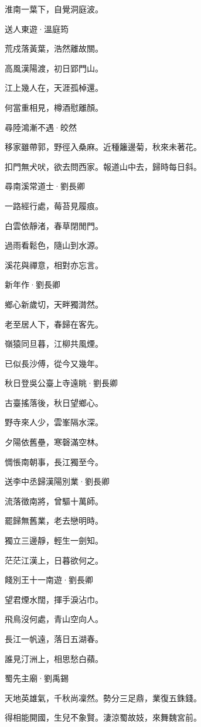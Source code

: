\documentclass[12pt,a4paper]{ctexbook}
\begin{document}
淮南一葉下，自覺洞庭波。\par
送人東遊·溫庭筠\par
荒戍落黃葉，浩然離故關。\par
高風漢陽渡，初日郢門山。\par
江上幾人在，天涯孤棹還。\par
何當重相見，樽酒慰離顏。\par
尋陸鴻漸不遇·皎然\par
移家雖帶郭，野徑入桑麻。近種籬邊菊，秋來未著花。\par
扣門無犬吠，欲去問西家。報道山中去，歸時每日斜。\par
尋南溪常道士·劉長卿\par
一路經行處，莓苔見履痕。\par
白雲依靜渚，春草閉閒門。\par
過雨看鬆色，隨山到水源。\par
溪花與禪意，相對亦忘言。\par
新年作·劉長卿\par
鄉心新歲切，天畔獨潸然。\par
老至居人下，春歸在客先。\par
嶺猿同旦暮，江柳共風煙。\par
已似長沙傅，從今又幾年。\par
秋日登吳公臺上寺遠眺·劉長卿\par
古臺搖落後，秋日望鄉心。\par
野寺來人少，雲峯隔水深。\par
夕陽依舊壘，寒磬滿空林。\par
惆悵南朝事，長江獨至今。\par
送李中丞歸漢陽別業·劉長卿\par
流落徵南將，曾驅十萬師。\par
罷歸無舊業，老去戀明時。\par
獨立三邊靜，輕生一劍知。\par
茫茫江漢上，日暮欲何之。\par
餞別王十一南遊·劉長卿\par
望君煙水闊，揮手淚沾巾。\par
飛鳥沒何處，青山空向人。\par
長江一帆遠，落日五湖春。\par
誰見汀洲上，相思愁白蘋。\par
蜀先主廟·劉禹錫\par
天地英雄氣，千秋尚凜然。勢分三足鼎，業復五銖錢。\par
得相能開國，生兒不象賢。淒涼蜀故妓，來舞魏宮前。\par
\end{document}
